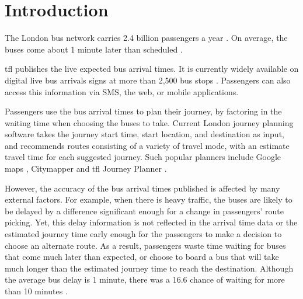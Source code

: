 \chapter{Introduction}

\par The London bus network carries 2.4 billion passengers a year \cite{tfl_annual_report_13/14}. On average, the buses come about 1 minute later than scheduled \cite{buses_performance_report}.

\par \acrfull{tfl} publishes the live expected bus arrival times. It is currently widely available on digital live bus arrivals signs at more than 2,500 bus stops \cite{live_bus_arrivals}. Passengers can also access this information via SMS, the web, or mobile applications.


\par Passengers use the bus arrival times to plan their journey, by factoring in the waiting time when choosing the buses to take. Current London journey planning software takes the journey start time, start location, and destination as input, and recommends routes consisting of a variety of travel mode, with an estimate travel time for each suggested journey. Such popular planners include Google maps \cite{google_maps}, Citymapper \cite{citymapper} and \acrshort{tfl} Journey Planner \cite{tfl_journey_planner}.

\par However, the accuracy of the bus arrival times published is affected by many external factors. For example, when there is heavy traffic, the buses are likely to be delayed by a difference significant enough for a change in passengers' route picking. Yet, this delay information is not reflected in the arrival time data or the estimated journey time early enough for the passengers to make a decision to choose an alternate route. As a result, passengers waste time waiting for buses that come much later than expected, or choose to board a bus that will take much longer than the estimated journey time to reach the destination. Although the average bus delay is 1 minute, there was a 16.6 chance of waiting for more than 10 minutes \cite{buses_performance_data}.


